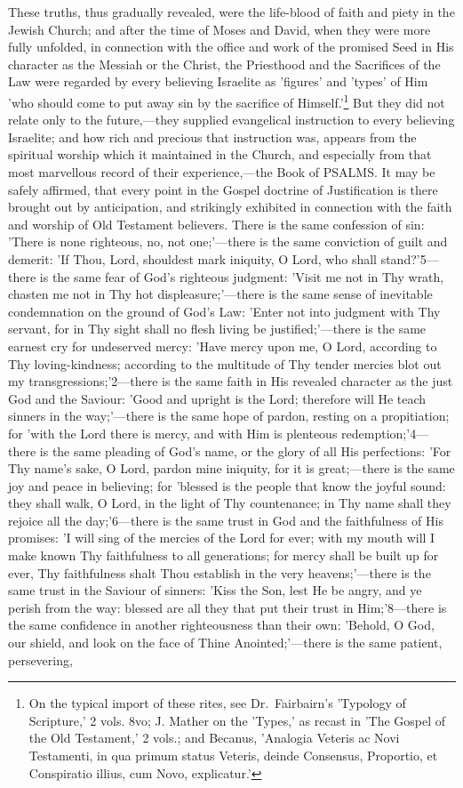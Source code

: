 \documentclass[
]{book}
\begin{document}
These truths, thus gradually revealed, were the life-blood of faith and piety in the Jewish Church; and after the time of Moses and David, when they were more fully unfolded, in connection with the office and work of the promised Seed in His character as the Messiah or the Christ, the Priesthood and the Sacrifices of the Law were regarded by every believing Israelite as 'figures' and 'types' of Him 'who should come to put away sin by the sacrifice of Himself.'\footnote{On the typical import of these rites, see Dr.~Fairbairn's 'Typology of Scripture,' 2 vols. 8vo; J. Mather on the 'Types,' as recast in 'The Gospel of the Old Testament,' 2 vols.; and Becanus, 'Analogia Veteris ac Novi Testamenti, in qua primum status Veteris, deinde Consensus, Proportio, et Conspiratio illius, cum Novo, explicatur.'} But they did not relate only to the future,---they supplied evangelical instruction to every believing Israelite; and how rich and precious that instruction was, appears from the spiritual worship which it maintained in the Church, and especially from that most marvellous record of their experience,---the Book of PSALMS. It may be safely affirmed, that every point in the Gospel doctrine of Justification is there brought out by anticipation, and strikingly exhibited in connection with the faith and worship of Old Testament believers. There is the same confession of sin: 'There is none righteous, no, not one;'---there is the same conviction of guilt and demerit: 'If Thou, Lord, shouldest mark iniquity, O Lord, who shall stand?'5---there is the same fear of God's righteous judgment: 'Visit me not in Thy wrath, chasten me not in Thy hot displeasure;'---there is the same sense of inevitable condemnation on the ground of God's Law: 'Enter not into judgment with Thy servant, for in Thy sight shall no flesh living be justified;'---there is the same earnest cry for undeserved mercy: 'Have mercy upon me, O Lord, according to Thy loving-kindness; according to the multitude of Thy tender mercies blot out my transgressions;'2---there is the same faith in His revealed character as the just God and the Saviour: 'Good and upright is the Lord; therefore will He teach sinners in the way;'---there is the same hope of pardon, resting on a propitiation; for 'with the Lord there is mercy, and with Him is plenteous redemption;'4---there is the same pleading of God's name, or the glory of all His perfections: 'For Thy name's sake, O Lord, pardon mine iniquity, for it is great;---there is the same joy and peace in believing; for 'blessed is the people that know the joyful sound: they shall walk, O Lord, in the light of Thy countenance; in Thy name shall they rejoice all the day;'6---there is the same trust in God and the faithfulness of His promises: 'I will sing of the mercies of the Lord for ever; with my mouth will I make known Thy faithfulness to all generations; for mercy shall be built up for ever, Thy faithfulness shalt Thou establish in the very heavens;'---there is the same trust in the Saviour of sinners: 'Kiss the Son, lest He be angry, and ye perish from the way: blessed are all they that put their trust in Him;'8---there is the same confidence in another righteousness than their own: 'Behold, O God, our shield, and look on the face of Thine Anointed;'---there is the same patient, persevering, 
\end{document}
